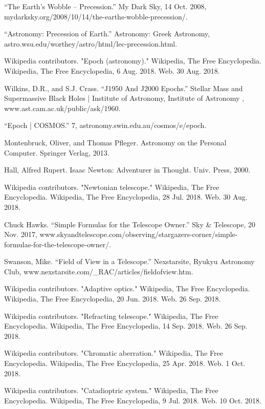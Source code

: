\documentclass[a4paper,twoside,11pt]{article}
\numberwithin{equation}{section}
\begin{document}
\begin{thebibliography}{300}
“The Earth's Wobble – Precession.” My Dark Sky, 14 Oct. 2008, mydarksky.org/2008/10/14/the-earths-wobble-precession/.

“Astronomy: Precession of Earth.” Astronomy: Greek Astronomy, astro.wsu.edu/worthey/astro/html/lec-precession.html.

Wikipedia contributors. "Epoch (astronomy)." Wikipedia, The Free Encyclopedia. Wikipedia, The Free Encyclopedia, 6 Aug. 2018. Web. 30 Aug. 2018.

Wilkins, D.R., and S.J. Crass. “J1950 And J2000 Epochs.” Stellar Mass and Supermassive Black Holes | Institute of Astronomy, Institute of Astronomy , www.ast.cam.ac.uk/public/ask/1960.

“Epoch | COSMOS.” 7, astronomy.swin.edu.au/cosmos/e/epoch.

Montenbruck, Oliver, and Thomas Pfleger. Astronomy on the Personal Computer. Springer Verlag, 2013.

Hall, Alfred Rupert. Isaac Newton: Adventurer in Thought. Univ. Press, 2000.

Wikipedia contributors. "Newtonian telescope." Wikipedia, The Free Encyclopedia. Wikipedia, The Free Encyclopedia, 28 Jul. 2018. Web. 30 Aug. 2018.

Chuck Hawks. “Simple Formulas for the Telescope Owner.” Sky \& Telescope, 20 Nov. 2017, www.skyandtelescope.com/observing/stargazers-corner/simple-formulas-for-the-telescope-owner/.

Swanson, Mike. “Field of View in a Telescope.” Nexstarsite, Ryukyu Astronomy Club, www.nexstarsite.com/\_RAC/articles/fieldofview.htm.

Wikipedia contributors. "Adaptive optics." Wikipedia, The Free Encyclopedia. Wikipedia, The Free Encyclopedia, 20 Jun. 2018. Web. 26 Sep. 2018.

Wikipedia contributors. "Refracting telescope." Wikipedia, The Free Encyclopedia. Wikipedia, The Free Encyclopedia, 14 Sep. 2018. Web. 26 Sep. 2018.

Wikipedia contributors. "Chromatic aberration." Wikipedia, The Free Encyclopedia. Wikipedia, The Free Encyclopedia, 25 Apr. 2018. Web. 1 Oct. 2018.

Wikipedia contributors. "Catadioptric system." Wikipedia, The Free Encyclopedia. Wikipedia, The Free Encyclopedia, 9 Jul. 2018. Web. 10 Oct. 2018.


\end{thebibliography}
\end{document}
